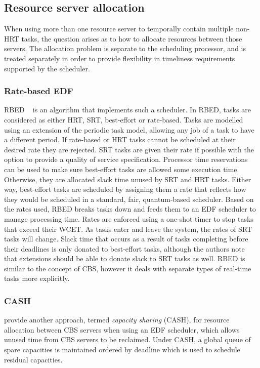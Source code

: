 \subsection{Resource server allocation}

When using more than one resource server to temporally contain multiple non-HRT tasks, the question
arises as to how to allocate resources between those servers. The allocation problem is separate to 
the scheduling processor, and is treated separately in order to provide flexibility in timeliness requirements supported by the scheduler.

\subsubsection{Rate-based EDF}

\Gls{RBED} ~\citep{Brandt_BLB_03} is an algorithm that implements such a
scheduler.  In \gls{RBED}, tasks are considered as either \gls{HRT}, \gls{SRT}, best-effort or
rate-based.  Tasks are modelled using an extension of the periodic task model, allowing any job of a
task to have a different period.  If rate-based or \gls{HRT} tasks cannot be scheduled at their
desired rate they are rejected.  \gls{SRT} tasks are given their rate if possible with the option to
provide a quality of service specification.  Processor time reservations can be used to make sure
best-effort tasks are allowed some execution time.  Otherwise, they are allocated slack time unused
by SRT and HRT tasks.  Either way, best-effort tasks are scheduled by assigning them a rate that
reflects how they would be scheduled in a standard, fair, quantum-based scheduler.  Based on the
rates used, \gls{RBED} breaks tasks down and feeds them to an \gls{EDF} scheduler to manage
processing time.  Rates are enforced using a one-shot timer to stop tasks that exceed their
{\gls{WCET}}.  As tasks enter and leave the system, the rates of \gls{SRT} tasks will change.  Slack
time that occurs as a result of tasks completing before their deadlines is only donated to 
best-effort tasks, although the authors note that extensions should be able to donate slack to \gls{SRT}
tasks as well.  \Gls{RBED} is similar to the concept of \gls{CBS}, however it deals with separate types of
real-time tasks more explicitly.

\subsubsection{CASH}

\citet{Caccamo_BS_00} provide another approach, termed \emph{capacity sharing} (CASH), for resource allocation between \gls{CBS} servers
when using an \gls{EDF} scheduler, which allows unused time from CBS servers to be reclaimed. Under
CASH, a global queue of spare capacities is maintained ordered by deadline which is used to schedule
residual capacities.


